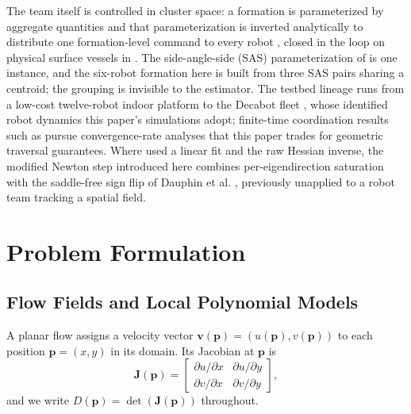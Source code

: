\documentclass[lettersize,journal]{IEEEtran}
\begin{document}
The team itself is controlled in cluster space: a formation is
parameterized by aggregate quantities and that parameterization is
inverted analytically to distribute one formation-level command to
every robot \cite{30}, closed in the loop on physical surface vessels
in \cite{31}. The side-angle-side (SAS) parameterization of \cite{14}
is one instance, and the six-robot formation here is built from three
SAS pairs sharing a centroid; the grouping is invisible to the
estimator. The testbed lineage runs from a low-cost twelve-robot indoor
platform \cite{32} to the Decabot fleet \cite{33}, whose identified
robot dynamics this paper's simulations adopt; finite-time coordination
results such as \cite{34} pursue convergence-rate analyses that this
paper trades for geometric traversal guarantees. Where \cite{14} used a
linear fit and \cite{15} the raw Hessian inverse, the modified Newton
step introduced here combines per-eigendirection saturation with the
saddle-free sign flip of Dauphin et al. \cite{35}, previously unapplied
to a robot team tracking a spatial field.

\section{Problem Formulation}
\label{sec:detj_field}

\subsection{Flow Fields and Local Polynomial Models}

A planar flow assigns a velocity vector $\mathbf{v}(\mathbf{p}) =
(u(\mathbf{p}), v(\mathbf{p}))$ to each position $\mathbf{p} = (x, y)$ in its
domain. Its Jacobian at $\mathbf{p}$ is
\begin{equation}
    \mathbf{J}(\mathbf{p}) =
    \begin{bmatrix}
        \partial u / \partial x & \partial u / \partial y \\
        \partial v / \partial x & \partial v / \partial y
    \end{bmatrix},
    \label{eq:jacobian}
\end{equation}
and we write $D(\mathbf{p}) = \det(\mathbf{J}(\mathbf{p}))$ throughout.
\end{document}
